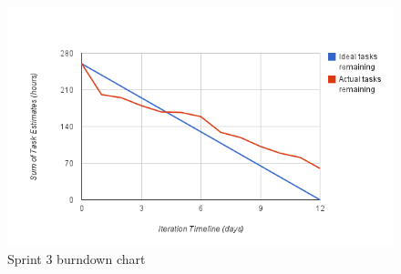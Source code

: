 \begin{figure}
	\begin{center}
		\includegraphics[width=15cm]{Pictures/Charts/Sprint3burndown}
	\end{center}
	\caption{Sprint 3 burndown chart}
	\label{fig:sprint3burndown}
\end{figure}

